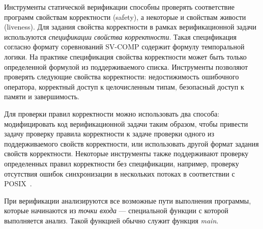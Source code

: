 \documentclass[%
candidate,     %
href,        %
colorlinks,  %
]{disser}
\begin{document}
Инструменты статической верификации способны проверять соответствие программ свойствам корректности (safety), а некоторые и свойствам живости (liveness).
Для задания свойства корректности в рамках верификационной задачи используются \textit{спецификации свойства корректности}.
Такая спецификация согласно формату соревнований \mbox{SV-COMP} содержит формулу темпоральной логики.
На практике спецификация свойства корректности может быть только определенной формулой из поддерживаемого списка.
Инструменты позволяют проверять следующие свойства корректности: недостижимость ошибочного оператора, корректный доступ к целочисленным типам, безопасный доступ к памяти и завершимость.

Для проверки правил корректности можно использовать два способа: модифицировать код верификационной задачи таким образом, чтобы привести задачу проверку правила корректности к задаче проверки одного из поддерживаемого свойств корректности, или использовать другой формат задания свойств корректности.
Некоторые инструменты также поддерживают проверку определенных правил корректности без спецификации, например, проверку отсутствия ошибок синхронизации в нескольких потоках в соответствии с POSIX~\cite{races17}.

При верификации анализируются все возможные пути выполнения программы, которые начинаются из \textit{точки входа} --- специальной функции с которой выполняется анализ.
Такой функцией обычно служит функция \textit{main}.
\end{document}
